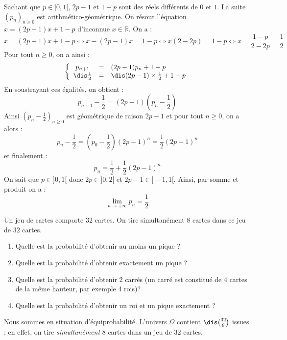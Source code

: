 \documentclass[a4paper,10pt]{report}
\begin{document}
\noindent Sachant que $p \in ]0,1[$, $2p-1$ et $1-p$ sont des réels différents de $0$ et $1$. La suite $(p_n)_{n \geq 0}$ est arithmético-géométrique. On résout l'équation $x=(2p-1)x+1-p$ d'inconnue $x \in \mathbb{R}$. On a :
\[ x= (2p-1)x+1-p \Longleftrightarrow x-(2p-1)x=1-p \Longleftrightarrow x(2-2p)= 1-p \Longleftrightarrow x = \frac{1-p}{2-2p} = \frac{1}{2} \]
Pour tout $n \geq 0$, on a ainsi :
\[ \left\lbrace \begin{array}{ccl}
p_{n+1} & = & (2p-1)p_n+1-p \\
\dis \frac{1}{2} & = & \dis(2p-1) \times \frac{1}{2} + 1-p \\
\end{array}\right.\]
En soustrayant ces égalités, on obtient :
\[ p_{n+1} - \frac{1}{2} = (2p-1)\left(p_n - \frac{1}{2} \right) \]
Ainsi $\left( p_n - \frac{1}{2} \right)_{n \geq 0}$ est géométrique de raison $2p-1$ et pour tout $n \geq 0$, on a alors :
\[ p_n - \frac{1}{2} = \left( p_0 - \frac{1}{2} \right) (2p-1)^n =  \frac{1}{2} (2p-1)^n \]
et finalement :
\[ p_n = \frac{1}{2} + \frac{1}{2} (2p-1)^n \]
On sait que $p \in ]0,1[$ donc $2p \in ]0,2[$ et $2p-1 \in ]-1,1[$. Ainsi, par somme et produit on a :
\[ \lim_{n \rightarrow + \infty} p_n = \frac{1}{2} \]

\begin{Exa} Un jeu de cartes comporte $32$ cartes. On tire simultanément $8$ cartes dans ce jeu de $32$ cartes. 

\begin{enumerate}
\item Quelle est la probabilité d'obtenir au moins un pique ?
\item Quelle est la probabilité d'obtenir exactement un pique ?
\item Quelle est la probabilité d'obtenir 2 carrés (un carré est constitué de 4 cartes de la même hauteur, par exemple 4 rois)?
\item Quelle est la probabilité d'obtenir un roi et un pique exactement ?
\end{enumerate}
\end{Exa} 

\corr Nous sommes en situation d'équiprobabilité. L'univers $\Omega$ contient $\dis \binom{32}{8}$ issues : en effet, on tire \textit{simultanément} 8 cartes dans un jeu de 32 cartes.
\end{document}
